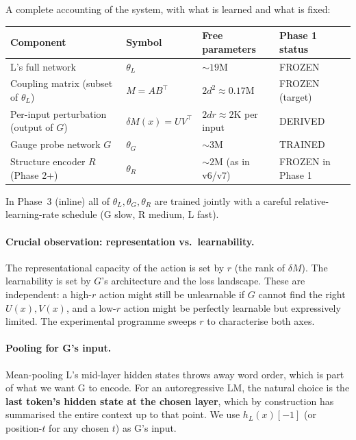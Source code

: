 \documentclass[11pt, a4paper]{article}
\theoremstyle{plain}
\theoremstyle{definition}
\theoremstyle{remark}
\begin{document}
A complete accounting of the system, with what is learned and what is fixed:

\begin{center}
\small
\begin{tabular}{p{4cm} p{2cm} p{4cm} p{3cm}}
\toprule
Component & Symbol & Free parameters & Phase 1 status \\
\midrule
L's full network & $\theta_{L}$ & $\sim 19$M & FROZEN \\
Coupling matrix (subset of $\theta_{L}$) & $M = AB^{\!\top}$ & $2d^{2} \approx 0.17$M & FROZEN (target) \\
Per-input perturbation (output of $G$) & $\delta M(x) = UV^{\!\top}$ & $2dr \approx 2$K per input & DERIVED \\
Gauge probe network $G$ & $\theta_{G}$ & $\sim 3$M & TRAINED \\
Structure encoder $R$ (Phase 2+) & $\theta_{R}$ & $\sim 2$M (as in v6/v7) & FROZEN in Phase 1 \\
\bottomrule
\end{tabular}
\end{center}

In Phase~3 (inline) all of $\theta_{L}, \theta_{G}, \theta_{R}$ are trained jointly with a careful relative-learning-rate schedule (G slow, R medium, L fast).

\paragraph{Crucial observation: representation vs.\ learnability.}
The representational capacity of the action is set by $r$ (the rank of $\delta M$).
The learnability is set by $G$'s architecture and the loss landscape.
These are independent: a high-$r$ action might still be unlearnable if $G$ cannot find the right $U(x), V(x)$, and a low-$r$ action might be perfectly learnable but expressively limited.
The experimental programme sweeps $r$ to characterise both axes.

\paragraph{Pooling for G's input.}
Mean-pooling L's mid-layer hidden states throws away word order, which is part of what we want G to encode.
For an autoregressive LM, the natural choice is the \textbf{last token's hidden state at the chosen layer}, which by construction has summarised the entire context up to that point.
We use $h_{L}(x)[-1]$ (or position-$t$ for any chosen $t$) as G's input.
\end{document}
